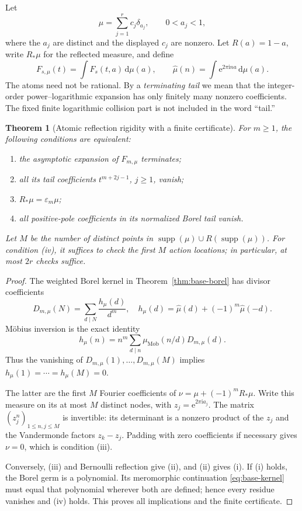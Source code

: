 \documentclass[11pt,a4paper]{article}
\numberwithin{equation}{section}
\newtheorem{theorem}{Theorem}[section]
\theoremstyle{definition}\newtheorem{definition}[theorem]{Definition}
\theoremstyle{remark}\newtheorem{remark}[theorem]{Remark}
\newcommand{\ii}{\mathrm i}\newcommand{\e}{\mathrm e}
\newcommand{\dd}{\,\mathrm d}\newcommand{\Li}{\operatorname{Li}}
\newcommand{\eps}{\varepsilon}\newcommand{\muh}{\widehat\mu}
\begin{document}
Let
\begin{equation}
 \mu=\sum_{j=1}^r c_j\delta_{a_j},\qquad
 0<a_j<1,
 \label{eq:atomic}
\end{equation}
where the $a_j$ are distinct and the displayed $c_j$ are nonzero.
Let $R(a)=1-a$, write $R_*\mu$ for the reflected measure, and define
\begin{equation}
 F_{s,\mu}(t)=\int F_s(t,a)\dd\mu(a),\qquad
 \muh(n)=\int\e^{2\pi\ii na}\dd\mu(a).
 \label{eq:weighted}
\end{equation}
The atoms need not be rational. By a \emph{terminating tail} we mean
that the integer-order power--logarithmic expansion has only finitely
many nonzero coefficients. The fixed finite logarithmic collision part
is not included in the word ``tail.''

\begin{theorem}[Atomic reflection rigidity with a finite certificate]
\label{thm:atomic}
For $m\ge1$, the following conditions are equivalent:
\begin{enumerate}[label=(\roman*),leftmargin=12mm]
\item the asymptotic expansion of $F_{m,\mu}$ terminates;
\item all its tail coefficients $t^{m+2j-1}$, $j\ge1$, vanish;
\item $R_*\mu=\eps_m\mu$;
\item all positive-pole coefficients in its normalized Borel tail vanish.
\end{enumerate}
Let $M$ be the number of distinct points in
$\operatorname{supp}(\mu)\cup R(\operatorname{supp}(\mu))$.
For condition (iv), it suffices to check the first $M$ action locations;
in particular, at most $2r$ checks suffice.
\end{theorem}
\begin{proof}
The weighted Borel kernel in Theorem~\ref{thm:base-borel} has divisor
coefficients
\begin{equation}
 D_{m,\mu}(N)=\sum_{d\mid N}\frac{h_\mu(d)}{d^m},
 \quad h_\mu(d)=\muh(d)+(-1)^m\muh(-d).
 \label{eq:D-mu}
\end{equation}
M\"obius inversion is the exact identity
\begin{equation}
 h_\mu(n)=n^m\sum_{d\mid n}\mu_{\mathrm{Mob}}(n/d)D_{m,\mu}(d).
 \label{eq:Mobius}
\end{equation}
Thus the vanishing of $D_{m,\mu}(1),\ldots,D_{m,\mu}(M)$ implies
$h_\mu(1)=\cdots=h_\mu(M)=0$.

The latter are the first $M$ Fourier coefficients of
$\nu=\mu+(-1)^mR_*\mu$. Write this measure on its at most $M$
distinct nodes, with $z_j=\e^{2\pi\ii a_j}$. The matrix
$(z_j^n)_{1\le n,j\le M}$ is invertible: its determinant is a nonzero
product of the $z_j$ and the Vandermonde factors $z_k-z_j$.
Padding with zero coefficients if necessary gives $\nu=0$, which is
condition (iii).

Conversely, (iii) and Bernoulli reflection give (ii), and (ii) gives
(i). If (i) holds, the Borel germ is a polynomial. Its meromorphic
continuation \eqref{eq:base-kernel} must equal that polynomial wherever
both are defined; hence every residue vanishes and (iv) holds.
This proves all implications and the finite certificate.
\end{proof}
\end{document}
